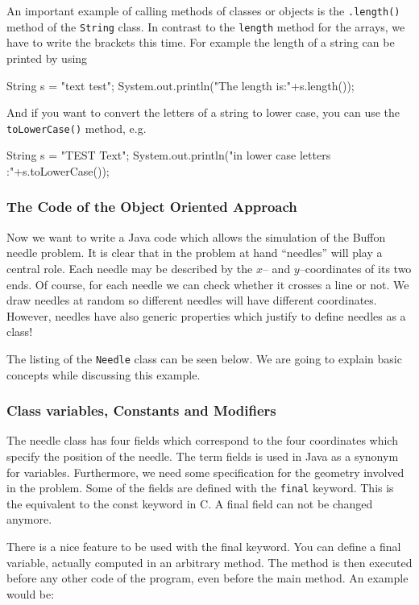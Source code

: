 An important example of calling methods of classes or objects is
the \verb|.length()| method of the \verb|String| class. In contrast
to the \verb|length| method for the arrays, we have to write the
brackets this time. For example the length of a string can
be printed by using
\begin{sverbatim}
   String s = "text test";
   System.out.println("The length is:"+s.length());
\end{sverbatim}
And if you want to convert the letters of a string to lower case,
you can use the \verb|toLowerCase()| method, e.g.
\begin{sverbatim}
   String s = "TEST Text";
   System.out.println("in lower case letters :"+s.toLowerCase());
\end{sverbatim}


\subsubsection{The Code of the Object Oriented Approach}
Now we want to
write a Java code which allows the simulation of the Buffon needle
problem. It is clear that in the problem at hand ``needles'' will play
a central role. Each needle may be described by the $x$-- and
$y$--coordinates of  its two ends. Of course, for each needle we can
check whether it crosses a line or not. We draw needles at random so
different needles will have different coordinates. However, needles
have also generic properties which justify to define needles as a class!

The listing of the \verb|Needle| class can be seen below. We are going
to explain basic concepts while discussing this example.


\subsubsection{Class variables, Constants and Modifiers}
The needle class has four fields which correspond to the four
coordinates which specify the position of the needle. 
The term fields is used in Java as a synonym for variables.
Furthermore, we
need some specification for the geometry involved in the problem.
Some of the fields  are
defined with the \verb|final| keyword. This is the equivalent to the
const keyword in C. A final field can not be changed anymore.

There is a nice feature to be used with the final keyword. You can
define a final variable, actually computed in an arbitrary method. 
The method is then executed before any other code of the program,
even before the main method. An example would be:

 
